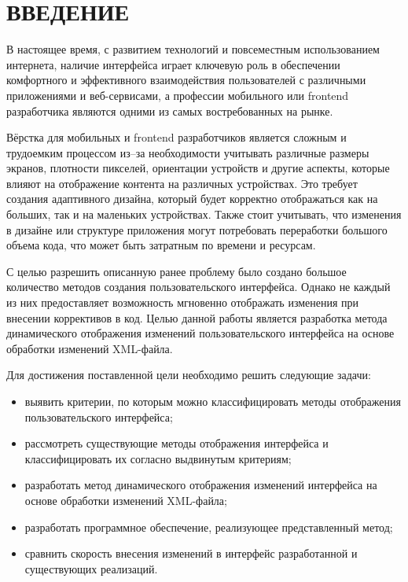\section*{ВВЕДЕНИЕ}

В настоящее время, с развитием технологий и повсеместным использованием интернета, наличие интерфейса играет ключевую роль в обеспечении комфортного и эффективного взаимодействия пользователей с различными приложениями и веб-сервисами, а профессии мобильного или frontend разработчика являются одними из самых востребованных на рынке. 

Вёрстка для мобильных и frontend разработчиков является сложным и трудоемким процессом из--за необходимости учитывать различные размеры экранов, плотности пикселей, ориентации устройств и другие аспекты, которые влияют на отображение контента на различных устройствах. 
Это требует создания адаптивного дизайна, который будет корректно отображаться как на больших, так и на маленьких устройствах. 
Также стоит учитывать, что изменения в дизайне или структуре приложения могут потребовать переработки большого объема кода, что может быть затратным по времени и ресурсам. 

С целью разрешить описанную ранее проблему было создано большое количество методов создания пользовательского интерфейса. 
Однако не каждый из них предоставляет возможность мгновенно отображать изменения при внесении коррективов в код. 
Целью данной работы является разработка метода динамического отображения изменений пользовательского интерфейса на основе обработки изменений XML-файла.

Для достижения поставленной цели необходимо решить следующие задачи:

\begin{itemize}
	\item выявить критерии, по которым можно классифицировать методы отображения пользовательского интерфейса;
	\item рассмотреть существующие методы отображения интерфейса и классифицировать их согласно выдвинутым критериям;
	\item разработать метод динамического отображения изменений интерфейса на основе обработки изменений XML-файла;
	\item разработать программное обеспечение, реализующее представленный метод;
	\item сравнить скорость внесения изменений в интерфейс разработанной и существующих реализаций.
\end{itemize}

\pagebreak
